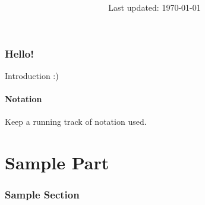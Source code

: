 \documentclass[10.5pt]{article}
\title{\textsc{\course}}
\author{\deets}
\date{Last updated: \today}
\theoremstyle{plain}
\begin{document}

\maketitle
\newpage

\setcounter{tocdepth}{2}
\tableofcontents
\newpage


\setcounter{section}{-1}
\section{Hello!}
Introduction :) 

\subsection*{Notation}
Keep a running track of notation used. 

\newpage
\part{Sample Part}\thispagestyle{empty}
\newpage
\section{Sample Section}

\end{document}
